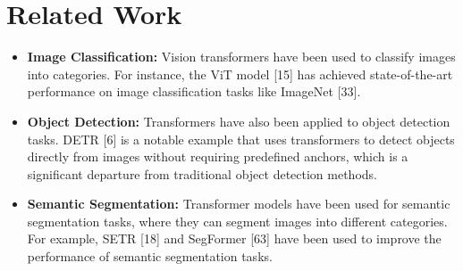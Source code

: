 \section{Related Work}
\begin{itemize}
    \item \textbf{Image Classification:} Vision transformers have been used to classify images into categories. For instance, the ViT model [15] has achieved state-of-the-art performance on image classification tasks like ImageNet [33].
    \item \textbf{Object Detection:} Transformers have also been applied to object detection tasks. DETR [6] is a notable example that uses transformers to detect objects directly from images without requiring predefined anchors, which is a significant departure from traditional object detection methods.
    \item \textbf{Semantic Segmentation:} Transformer models have been used for semantic segmentation tasks, where they can segment images into different categories. For example, SETR [18] and SegFormer [63] have been used to improve the performance of semantic segmentation tasks.
\end{itemize}